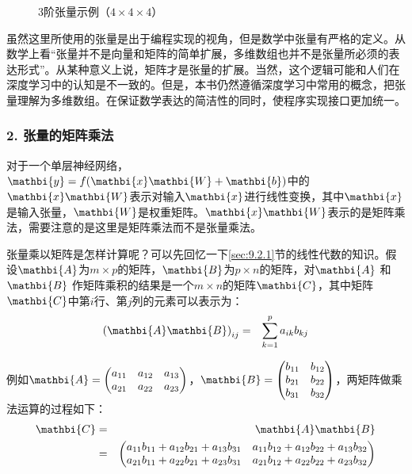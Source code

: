 \begin{figure}[htp]
\centering

\caption{3阶张量示例（$4 \times 4 \times 4$）}
\label{fig:9-25}
\end{figure}

\parinterval 虽然这里所使用的张量是出于编程实现的视角，但是数学中张量有严格的定义。从数学上看“张量并不是向量和矩阵的简单扩展，多维数组也并不是张量所必须的表达形式”。从某种意义上说，矩阵才是张量的扩展。当然，这个逻辑可能和人们在深度学习中的认知是不一致的。但是，本书仍然遵循深度学习中常用的概念，把张量理解为多维数组。在保证数学表达的简洁性的同时，使程序实现接口更加统一。


\subsubsection{2. 张量的矩阵乘法}

\parinterval 对于一个单层神经网络，$ {\mathbi{y}}=f({\mathbi{x}}{\mathbi{W}}+{\mathbi{b}}) $中的${\mathbi{x}}{\mathbi{W}} $表示对输入${\mathbi{x}} $进行线性变换，其中${\mathbi{x}}$是输入张量，$ {\mathbi{W}}$是权重矩阵。$ {\mathbi{x}} {\mathbi{W}} $表示的是矩阵乘法，需要注意的是这里是矩阵乘法而不是张量乘法。

\parinterval 张量乘以矩阵是怎样计算呢？可以先回忆一下\ref{sec:9.2.1}节的线性代数的知识。假设$ {\mathbi{A}} $为$ m\times p $的矩阵，$ {\mathbi{B}} $为$ p\times n $的矩阵，对${\mathbi{A}} $ 和${\mathbi{B}}$ 作矩阵乘积的结果是一个$ m\times n $的矩阵${\mathbi{C}}$，其中矩阵${\mathbi{C}}$中第$ i $行、第$ j $列的元素可以表示为：
\begin{eqnarray}
{({\mathbi{A}}{\mathbi{B}})}_{ij}&=&\sum_{k=1}^{p}{a_{ik}b_{kj}}
\label{eq:9-24}
\end{eqnarray}

\noindent 例如$ {\mathbi{A}}= \begin{pmatrix} a_{11} & a_{12} & a_{13}\\a_{21} & a_{22} & a_{23}\end{pmatrix} $，$ {\mathbi{B}}= \begin{pmatrix} b_{11} & b_{12}\\b_{21} & b_{22}\\b_{31} & b_{32}\end{pmatrix} $，两矩阵做乘法运算的过程如下：
\begin{eqnarray}
{\mathbi{C}} & = & {\mathbi{A}}{\mathbi{B}} \nonumber \\
                & = & \begin{pmatrix} a_{11}b_{11}+a_{12}b_{21}+a_{13}b_{31} & a_{11}b_{12}+a_{12}b_{22}+a_{13}b_{32}\\a_{21}b_{11}+a_{22}b_{21}+a_{23}b_{31} & a_{21}b_{12}+a_{22}b_{22}+a_{23}b_{32}\end{pmatrix}
\label{eq:9-108}
\end{eqnarray}


